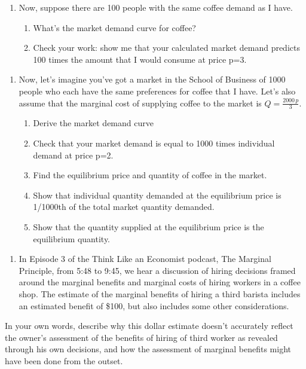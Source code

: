 \documentclass[11pt,]{article}
\providecommand{\tightlist}{%
  \setlength{\itemsep}{0pt}\setlength{\parskip}{0pt}}
\begin{document}
\newpage

\begin{enumerate}
\def\labelenumi{\arabic{enumi}.}
\setcounter{enumi}{1}
\tightlist
\item
  Now, suppose there are 100 people with the same coffee demand as I
  have.

  \begin{enumerate}
  \def\labelenumii{\alph{enumii})}
  \tightlist
  \item
    What's the market demand curve for coffee?
  \item
    Check your work: show me that your calculated market demand predicts
    100 times the amount that I would consume at price p=3.
  \end{enumerate}
\end{enumerate}

\newpage

\begin{enumerate}
\def\labelenumi{\arabic{enumi}.}
\setcounter{enumi}{2}
\tightlist
\item
  Now, let's imagine you've got a market in the School of Business of
  1000 people who each have the same preferences for coffee that I have.
  Let's also assume that the marginal cost of supplying coffee to the
  market is \(Q=\frac{2000\,p}{3}\).

  \begin{enumerate}
  \def\labelenumii{\alph{enumii})}
  \tightlist
  \item
    Derive the market demand curve
  \item
    Check that your market demand is equal to 1000 times individual
    demand at price p=2.
  \item
    Find the equilibrium price and quantity of coffee in the market.
  \item
    Show that individual quantity demanded at the equilibrium price is
    1/1000th of the total market quantity demanded.
  \item
    Show that the quantity supplied at the equilibrium price is the
    equilibrium quantity.
  \end{enumerate}
\end{enumerate}

\newpage

\begin{enumerate}
\def\labelenumi{\arabic{enumi}.}
\setcounter{enumi}{3}
\tightlist
\item
  In Episode 3 of the Think Like an Economist podcast, The Marginal
  Principle, from 5:48 to 9:45, we hear a discussion of hiring decisions
  framed around the marginal benefits and marginal costs of hiring
  workers in a coffee shop. The estimate of the marginal benefits of
  hiring a third barista includes an estimated benefit of \$100, but
  also includes some other considerations.
\end{enumerate}

In your own words, describe why this dollar estimate doesn't accurately
reflect the owner's assessment of the benefits of hiring of third worker
as revealed through his own decisions, and how the assessment of
marginal benefits might have been done from the outset.
\end{document}
